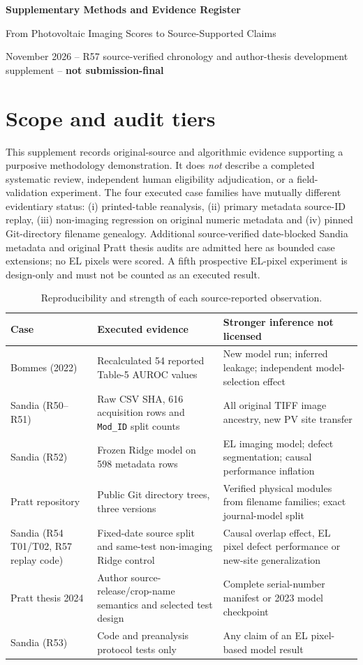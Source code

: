 \documentclass[10pt,a4paper]{article}
\begin{document}
\begin{center}
{\Large \bfseries Supplementary Methods and Evidence Register}\par
\medskip
{\normalsize From Photovoltaic Imaging Scores to Source-Supported Claims}\par
{} November 2026 -- R57 source-verified chronology and author-thesis development supplement -- \textbf{not submission-final}
\end{center}
\section{Scope and audit tiers}
This supplement records original-source and algorithmic evidence supporting a purposive methodology demonstration. It does \emph{not} describe a completed systematic review, independent human eligibility adjudication, or a field-validation experiment. The four executed case families have mutually different evidentiary status: (i) printed-table reanalysis, (ii) primary metadata source-ID replay, (iii) non-imaging regression on original numeric metadata and (iv) pinned Git-directory filename genealogy. Additional source-verified date-blocked Sandia metadata and original Pratt thesis audits are admitted here as bounded case extensions; no EL pixels were scored. A fifth prospective EL-pixel experiment is design-only and must not be counted as an executed result.

\begin{table}[ht]\centering\small
\caption{Reproducibility and strength of each source-reported observation.}
\begin{tabularx}{\linewidth}{@{}p{2.5cm}p{2.3cm}X@{}}\toprule
Case & Executed evidence & Stronger inference not licensed \\\midrule
Bommes (2022) & Recalculated 54 reported Table-5 AUROC values & New model run; inferred leakage; independent model-selection effect \\
Sandia (R50--R51) & Raw CSV SHA, 616 acquisition rows and \texttt{Mod\_ID} split counts & All original TIFF image ancestry, new PV site transfer \\
Sandia (R52) & Frozen Ridge model on 598 metadata rows & EL imaging model; defect segmentation; causal performance inflation \\
Pratt repository & Public Git directory trees, three versions & Verified physical modules from filename families; exact journal-model split \\
Sandia (R54 T01/T02, R57 replay code) & Fixed-date source split and same-test non-imaging Ridge control & Causal overlap effect, EL pixel defect performance or new-site generalization \\
Pratt thesis 2024 & Author source-release/crop-name semantics and selected test design & Complete serial-number manifest or 2023 model checkpoint \\
Sandia (R53) & Code and preanalysis protocol tests only & Any claim of an EL pixel-based model result \\
\bottomrule\end{tabularx}
\end{table}
\end{document}
